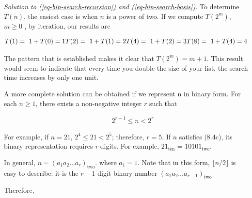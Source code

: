 \documentclass[10pt,]{book}
\theoremstyle{plain}
\theoremstyle{definition}
\theoremstyle{definition}
\theoremstyle{definition}
\theoremstyle{definition}
\numberwithin{equation}{section}
\begin{document}
%
\par
\emph{Solution to \hyperref[eq-bin-search-recursion]{(\ref{eq-bin-search-recursion})}  and \hyperref[eq-bin-search-basis]{(\ref{eq-bin-search-basis})}.}  To determine \(T(n)\), the easiest case is when \(n\) is a power of two. If we compute \(T \left(2^m\right)\),
\(m\geq 0\) , by iteration, our results are

\begin{equation*}T(1) = \text{ }1 + T(0) = 1\\
\\
T(2) = \text{ }1 + T(1) = 2\\
\\
T(4) = \text{ }1 + T(2) = 3\\
\\
T(8) = \text{ }1 + T(4) = 4
\end{equation*}

The pattern that is established makes it clear that \(T\left(2^m\right) = m + 1\). This result would seem to indicate that every time you double the size of your list, the search time increases by only one unit.%
\par
A more complete solution can be obtained if we represent n in binary form. For each \(n\geq 1\), there exists a non-negative integer \(r\) such that

\begin{gather}
\quad \quad 2^{r-1}\leq n < 2^r\label{eq-inequality-84}
\end{gather} 

For example, if \(n = 21\), \(2^4 \leq  21 < 2^5\); therefore, \(r = 5\). If \(n\) satisfies (8.4c), its binary representation requires \textit{
r} digits. For example, \(21_{\text{ten}}\) = \(10101_{\textrm{two}}\).%
\par
In general, \(n = \left(a_1a_2\ldots  a_r\right)_{\textrm{two}}\). where \(a_1=1\). Note that in this form, \(\lfloor n/2\rfloor\) is easy to describe:
it is the \(r-1\) digit binary number \(\left(a_1a_2\ldots  a_{r-1}\right)_{\textrm{two}}\)%
\par
Therefore,
\end{document}
